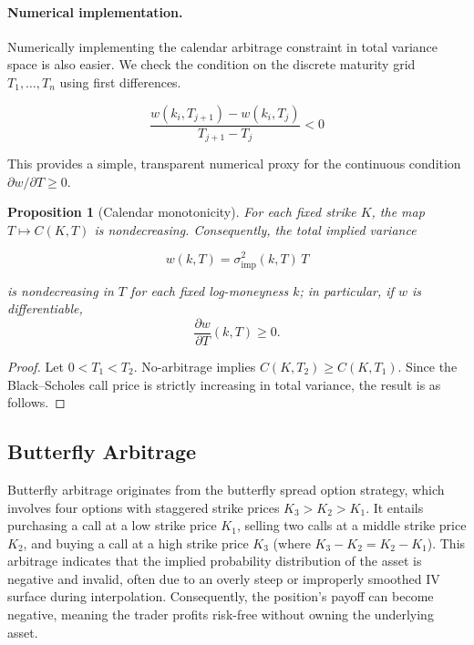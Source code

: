 \documentclass[12pt,oneside]{report}
\newtheorem{proposition}[theorem]{Proposition}
\theoremstyle{definition}
\theoremstyle{remark}
\begin{document}
\paragraph{Numerical implementation.}
Numerically implementing the calendar arbitrage constraint in total variance space is also easier. We check the condition on the discrete maturity grid $T_1, \dots, T_n$ using first differences. 

\[\frac{w(k_i,T_{j+1}) - w(k_i,T_j)}{T_{j+1} - T_j} < 0\]

This provides a simple, transparent numerical proxy for the continuous condition $\partial w/\partial T \geq 0$.

\begin{proposition}[Calendar monotonicity]
For each fixed strike \(K\), the map \(T\mapsto C(K,T)\) is nondecreasing. Consequently, the total implied variance

\[w(k,T)=\sigma_{\mathrm{imp}}^2(k,T)\,T\]

is nondecreasing in \(T\) for each fixed log-moneyness \(k\); in particular, if \(w\) is differentiable,
\[\frac{\partial w}{\partial T}(k,T) \geq 0.\]
\end{proposition}

\begin{proof}
Let \(0<T_1<T_2\). No-arbitrage implies \(C(K,T_2)\ge C(K,T_1)\). Since the Black--Scholes call price is strictly increasing in total variance, the result is as follows.
\end{proof}

\subsection{Butterfly Arbitrage}
\label{subsubsec:butterfly-arbitrage}

Butterfly arbitrage originates from the butterfly spread option strategy, which involves four options with staggered strike prices $K_3 > K_2 > K_1$. It entails purchasing a call at a low strike price $K_1$, selling two calls at a middle strike price $K_2$, and buying a call at a high strike price $K_3$ (where $K_3 - K_2 = K_2 - K_1$). This arbitrage indicates that the implied probability distribution of the asset is negative and invalid, often due to an overly steep or improperly smoothed IV surface during interpolation. Consequently, the position's payoff can become negative, meaning the trader profits risk-free without owning the underlying asset.
\end{document}

